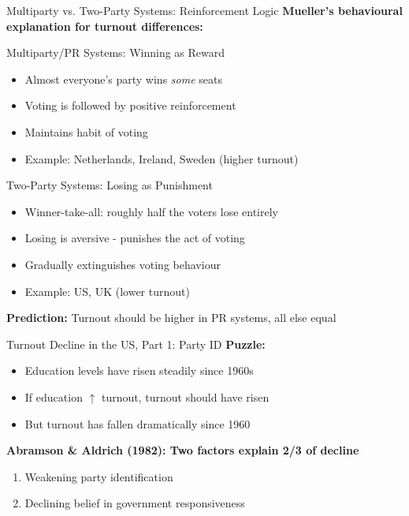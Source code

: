\documentclass[10pt]{beamer}
\begin{document}
\begin{frame}{Multiparty vs. Two-Party Systems: Reinforcement Logic}
\textbf{Mueller's behavioural explanation for turnout differences:}


\begin{block}{Multiparty/PR Systems: Winning as Reward}
\begin{itemize}
\item Almost everyone's party wins \emph{some} seats
\item Voting is followed by positive reinforcement
\item Maintains habit of voting
\item Example: Netherlands, Ireland, Sweden (higher turnout)
\end{itemize}
\end{block}


\begin{alertblock}{Two-Party Systems: Losing as Punishment}
\begin{itemize}
\item Winner-take-all: roughly half the voters lose entirely
\item Losing is aversive - punishes the act of voting
\item Gradually extinguishes voting behaviour
\item Example: US, UK (lower turnout)
\end{itemize}
\end{alertblock}


\textbf{Prediction:} Turnout should be higher in PR systems, all else equal
\end{frame}

\begin{frame}{Turnout Decline in the US, Part 1: Party ID}
\textbf{Puzzle:}
\begin{itemize}
\item Education levels have risen steadily since 1960s
\item If education $\uparrow$ turnout, turnout should have risen
\item But turnout has \alert{fallen dramatically} since 1960
\end{itemize}

\textbf{Abramson \& Aldrich (1982): Two factors explain 2/3 of decline}
\begin{enumerate}
\item Weakening party identification
\item Declining belief in government responsiveness
\end{enumerate}
\end{frame}
\end{document}
